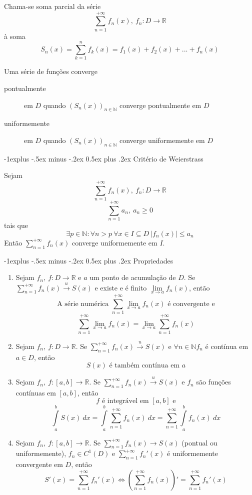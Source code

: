 \documentclass[10pt,landscape]{article}
\makeatletter
\renewcommand{\subsection}{\@startsection{subsection}{2}{0mm}%
                                {-1explus -.5ex minus -.2ex}%
                                {0.5ex plus .2ex}%
                                {\normalfont\normalsize\bfseries}}
\makeatother
\begin{document}
\begin{multicols}{3}
Chama-se soma parcial da série
$$\sum\limits_{n=1}^{+\infty} f_n(x),\ f_n: D \rightarrow \mathbb{R}$$
à soma
$$S_n(x) = \sum\limits_{k=1}^{n} f_k(x) = f_1(x) + f_2(x) + ... + f_n(x)$$

Uma série de funções converge
\begin{description}
\item[pontualmente] em $D$ quando $\left( S_n(x)\right)_{n \in \mathbb{N}}$ converge pontualmente em $D$
\item[uniformemente] em $D$ quando $\left( S_n(x)\right)_{n \in \mathbb{N}}$ converge uniformemente em $D$
\end{description}

\subsection{Critério de Weierstrass}

Sejam
$$\sum\limits_{n=1}^{+\infty} f_n(x),\ f_n: D \rightarrow \mathbb{R}$$
$$\sum\limits_{n=1}^{+\infty} a_n,\ a_n \geq 0$$
tais que
$$\exists p \in \mathbb{N}: \forall n > p\ \forall x \in I \subseteq D\ \left| f_n(x)\right| \leq a_n$$
Então $\sum\limits_{n=1}^{+\infty} f_n(x)$ converge uniformemente em $I$.

\subsection{Propriedades}

\begin{enumerate}
\item Sejam $f_n,\ f: D \rightarrow \mathbb{R}$ e $a$ um ponto de acumulação de $D$. Se $\sum\limits_{n=1}^{+\infty} f_n(x) \xrightarrow{u} S(x)$ e existe e é finito $\lim\limits_{x \to a} f_n(x)$, então
$$\text{A série numérica } \sum\limits_{n=1}^{+\infty} \lim\limits_{x \to a} f_n(x) \text{ é convergente e}$$
$$\sum\limits_{n=1}^{+\infty} \lim\limits_{x \to a} f_n(x) = \lim\limits_{x \to a}\sum\limits_{n=1}^{+\infty} f_n(x)$$
\item Sejam $f_n,\ f: D \rightarrow \mathbb{R}$. Se $\sum\limits_{n=1}^{+\infty} f_n(x) \xrightarrow{u} S(x)$ e $\forall n \in \mathbb{N} f_n$ é contínua em $a \in D$, então
$$S(x) \text{ é também contínua em } a$$
\item Sejam $f_n,\ f: [a, b] \rightarrow \mathbb{R}$. Se $\sum\limits_{n=1}^{+\infty} f_n(x) \xrightarrow{u} S(x)$ e $f_n$ são funções contínuas em $[a, b]$, então
$$f \text{ é integrável em } [a, b] \text{ e}$$
$$\int\limits_a^b S(x)\ dx = \int\limits_a^b \sum\limits_{n=1}^{+\infty} f_n(x)\ dx = \sum\limits_{n=1}^{+\infty} \int\limits_a^b f_n(x)\ dx$$
\item Sejam $f_n,\ f: [a, b] \rightarrow \mathbb{R}$. Se $\sum\limits_{n=1}^{+\infty} f_n(x) \rightarrow S(x)$ (pontual ou uniformemente), $f_n \in C^1(D)$ e $\sum\limits_{n=1}^{+\infty} f_n'(x)$ é uniformemente convergente em $D$, então
$$S'(x) = \sum\limits_{n=1}^{+\infty} f_n'(x) \Leftrightarrow \left( \sum\limits_{n=1}^{+\infty} f_n(x)\right)' = \sum\limits_{n=1}^{+\infty} f_n'(x)$$
\end{enumerate}


\end{multicols}
\end{document}
